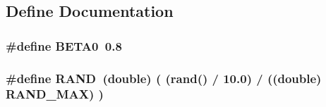 \subsection{Define Documentation}
\subsubsection[BETA0]{\setlength{\rightskip}{0pt plus 5cm}\#define BETA0~0.8}\label{neural_09_09_8hpp_05e2bb5b9fc32f0b6b4d84fe43177d72}


\subsubsection[RAND]{\setlength{\rightskip}{0pt plus 5cm}\#define RAND~(double) ( (rand() / 10.0) / ((double) RAND\_\-MAX) )}\label{neural_09_09_8hpp_839a9222721835f53c5b248241f535f4}


